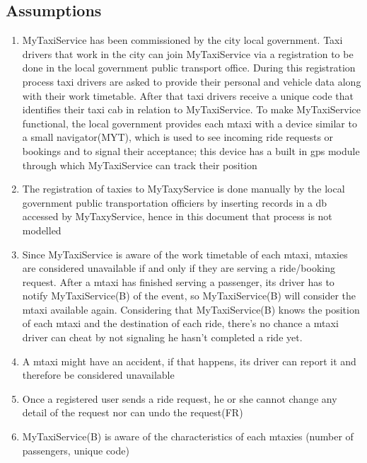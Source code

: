 \documentclass[11pt]{article} %
\begin{document}
        \subsection{Assumptions}
    \begin{enumerate}
        \item MyTaxiService has been commissioned by the city local government.
      Taxi drivers that work in the city can join MyTaxiService via a registration to be
      done in the local government public transport office.
      During this registration process taxi drivers are asked to provide their personal and vehicle data along with their work timetable.
      After that taxi drivers receive a unique code that identifies their taxi cab in relation to MyTaxiService.
      To make MyTaxiService functional, the local government provides each mtaxi with a device similar to a small navigator(MYT), which is used
      to see incoming ride requests or bookings and to signal their acceptance; this device has a built in gps module through which MyTaxiService can
      track their position
    \item The registration of taxies to MyTaxyService is done manually by the local government public transportation
    officiers by inserting records in a db accessed by MyTaxyService, hence in this document that process is
    not modelled
    \item Since MyTaxiService is aware of the work timetable of each mtaxi, mtaxies are considered unavailable
      if and only if they are serving a ride/booking request.  After a mtaxi has finished serving a passenger, its driver has to notify
      MyTaxiService(B) of the event, so MyTaxiService(B) will consider the mtaxi available again.
      Considering that MyTaxiService(B) knows the position of each mtaxi and the destination of each ride, there's no chance a mtaxi driver
      can cheat by not signaling he hasn't completed a ride yet.

    \item A mtaxi might have an accident, if that happens, its driver can report it and therefore
       be considered unavailable

    \item Once a registered user sends a ride request, he or she cannot change any detail of the request nor can
        undo the request(FR)

    \item MyTaxiService(B) is aware of the characteristics of each mtaxies (number of passengers, unique code)


\end{enumerate}
\end{document}
